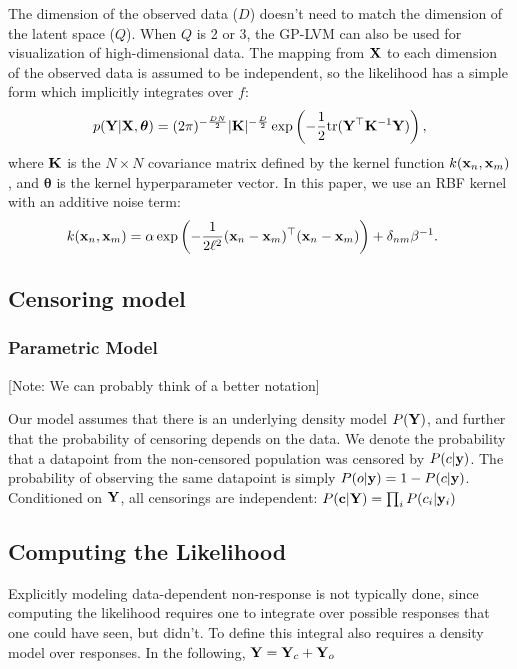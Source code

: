 \documentclass{article}
\begin{document}
The dimension of the observed data ($D$) doesn't need to match the dimension of the latent space ($Q$).  When $Q$ is 2 or 3, the GP-LVM can also be used for visualization of high-dimensional data.  The mapping from $\mathbf{X}$ to each dimension of the observed data is assumed to be independent, so the likelihood has a simple form which implicitly integrates over $f$:
%
\begin{align}
p(\mathbf{Y} | \mathbf{X},\bm{\theta})  = (2 \pi)^{-\frac{DN}{2}}  |\mathbf{K}|^{-\frac{D}{2}} \exp \left( -\frac{1}{2} {\rm tr}( \mathbf{Y}^{\top} \mathbf{K}^{-1} \mathbf{Y}) \right),
\label{eq:py_x}
\end{align}
where $\mathbf{K}$ is the $N \times N$ covariance matrix defined 
by the kernel function $k({\bf{x}}_{n},{\bf{x}}_{m})$,
and $\bm{\theta}$ is the kernel hyperparameter vector.
In this paper, we use an RBF kernel with an additive noise term:
\begin{align}
k({\bf{x}}_{n},{\bf{x}}_{m}) &= \alpha \exp\left( - \frac{1}{2 \ell^2}({\bf{x}}_n - {\bf{x}}_m)^{\top} ({\bf{x}}_n - {\bf{x}}_m) \right) + \delta_{nm} \beta^{-1}.
\end{align}


\subsection{Censoring model}

\subsubsection{Parametric Model}

[Note: We can probably think of a better notation]

Our model assumes that there is an underlying density model $P(\mathbf{Y})$, and further that the probability of censoring depends on the data.  We denote the probability that a datapoint from the non-censored population was censored by $P(c| {\bf{y}})$.  The probability of observing the same datapoint is simply $P(o| {\bf{y}}) = 1 - P(c| {\bf{y}})$.  Conditioned on $\mathbf{Y}$, all censorings are independent:  $P({\bf{c}}| \mathbf{Y}) = \prod_i P(c_i| {\bf{y}}_i)$


\subsection{Computing the Likelihood}

Explicitly modeling data-dependent non-response is not typically done, since computing the likelihood requires one to integrate over possible responses that one could have seen, but didn't.  To define this integral also requires a density model over responses.  In the following, $\mathbf{Y} = \mathbf{Y}_c + \mathbf{Y}_o$
\end{document}
